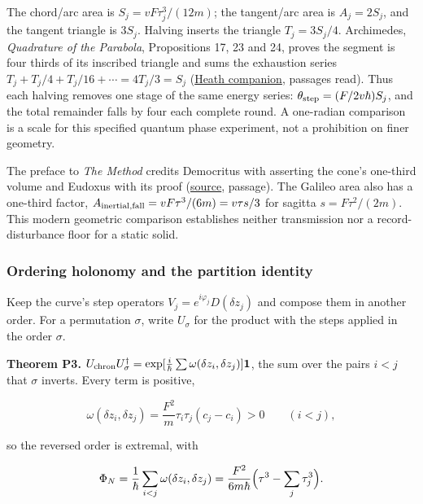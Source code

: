 \documentclass[11pt,a4paper]{article}
\begin{document}
The chord/arc area is \(S_j=vF\tau_j^3/(12m)\); the tangent/arc area is
\(A_j=2S_j\), and the tangent triangle is \(3S_j\). Halving inserts the
triangle \(T_j=3S_j/4\). Archimedes, \emph{Quadrature of the Parabola},
Propositions 17, 23 and 24, proves the segment is four thirds of its
inscribed triangle and sums the exhaustion series
\(T_j+T_j/4+T_j/16+\cdots=4T_j/3=S_j\)
(\href{../docs/classics/Archimedes_QuadratureParabola_Heath1897_OCR.md}{Heath
companion}, passages read). Thus each halving removes one stage of the
same energy series: \(\theta_{\rm step}=(F/2v\hbar)S_j\), and the total
remainder falls by four each complete round. A one-radian comparison is
a scale for this specified quantum phase experiment, not a prohibition
on finer geometry.

The preface to \emph{The Method} credits Democritus with asserting the
cone's one-third volume and Eudoxus with its proof
(\href{../docs/classics/Archimedes_Method_Heath1912_OCR.md}{source},
passage). The Galileo area also has a one-third factor,
\(A_{\rm inertial,fall}=vF\tau^3/(6m)=v\tau s/3\) for sagitta
\(s=F\tau^2/(2m)\). This modern geometric comparison establishes neither
transmission nor a record-disturbance floor for a static solid.

\hypertarget{ordering-holonomy-and-the-partition-identity}{%
\subsubsection{Ordering holonomy and the partition
identity}\label{ordering-holonomy-and-the-partition-identity}}

Keep the curve's step operators \(V_j=e^{i\varphi_j}D(\delta z_j)\) and
compose them in another order. For a permutation \(\sigma\), write
\(U_\sigma\) for the product with the steps applied in the order
\(\sigma\).

\textbf{Theorem P3.}
\(U_{\rm chron}U_\sigma^\dagger=\exp[\frac{i}{\hbar}\sum\omega(\delta z_i,\delta z_j)]\mathbf 1\),
the sum over the pairs \(i<j\) that \(\sigma\) inverts. Every term is
positive,

\[\omega(\delta z_i,\delta z_j)=\frac{F^2}{m}\tau_i\tau_j(c_j-c_i)>0\qquad(i<j),\]

so the reversed order is extremal, with

\[\Phi_N=\frac1\hbar\sum_{i<j}\omega(\delta z_i,\delta z_j)
=\frac{F^2}{6m\hbar}\Bigl(\tau^3-\sum_j\tau_j^3\Bigr).\]
\end{document}
